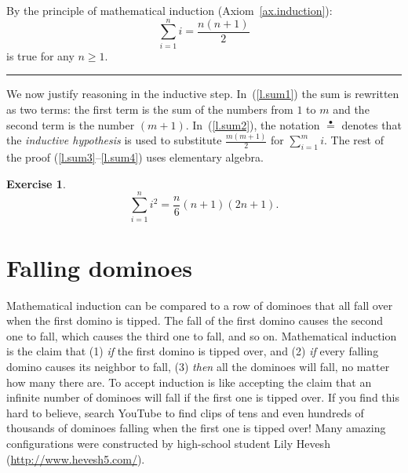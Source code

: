 \documentclass[11pt,a4paper]{report}
\newcommand*{\ih}{\stackrel{\bullet}{=}}
\newcommand*{\qed}{\hfill\rule{1ex}{1.5ex}}
\newtheorem{exercise}{Exercise}
\begin{document}
By the principle of mathematical induction (Axiom~\ref{ax.induction}):
\[
\sum_{i=1}^n i = \frac{n(n+1)}{2}
\] is true for any $n\geq 1$.\qed

We now justify reasoning in the inductive step. In~(\ref{l.sum1}) the sum is rewritten as two terms: the first term is the sum of the numbers from $1$ to $m$ and the second term is the number $(m+1)$. In~(\ref{l.sum2}), the notation $\ih{}$ denotes that the \emph{inductive hypothesis} is used to substitute $\frac{m(m+1)}{2}$ for $\sum_{i=1}^m i$. The rest of the proof (\ref{l.sum3}--\ref{l.sum4}) uses elementary algebra.

\begin{exercise}
\[
\sum_{i=1}^n i^2 = \frac{n}{6}(n+1)(2n+1).
\]
\end{exercise}

\medskip

\begin{center}
\end{center}

\begin{center}
\end{center}

\section{Falling dominoes}

Mathematical induction can be compared to a row of dominoes that all fall over when the first domino is tipped. The fall of the first domino causes the second one to fall, which causes the third one to fall, and so on. Mathematical induction is the claim that (1) \emph{if} the first domino is tipped over, and (2) \emph{if} every falling domino causes its neighbor to fall, (3) \emph{then} all the dominoes will fall, no matter how many there are. To accept induction is like accepting the claim that an infinite number of dominoes will fall if the first one is tipped over. If you find this hard to believe, search YouTube to find clips of tens and even hundreds of thousands of dominoes falling when the first one is tipped over! Many amazing configurations were constructed by high-school student Lily Hevesh (\url{http://www.hevesh5.com/}).
\end{document}
